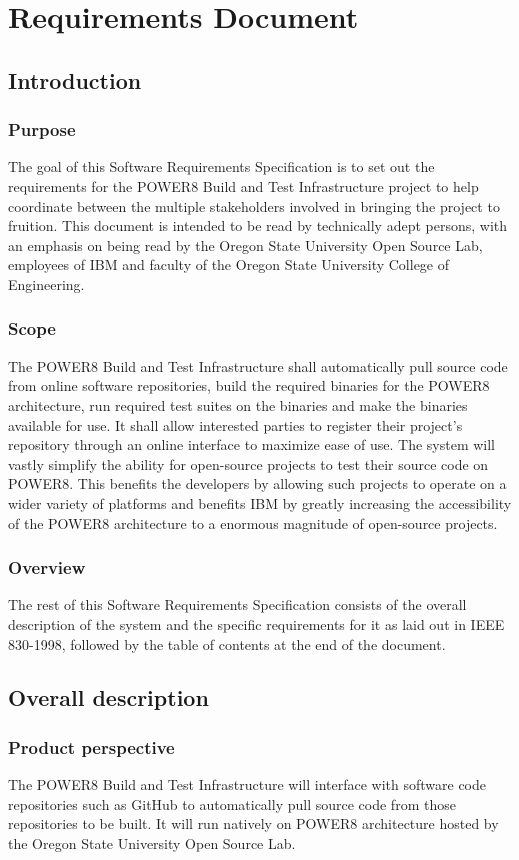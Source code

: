 \documentclass[10pt,letterpaper,onecolumn,draftclsnofoot]{IEEEtran}
\begin{document}
\section{Requirements Document}
\subsection{Introduction}
\subsubsection{Purpose}
The goal of this Software Requirements Specification is to set out the requirements for the POWER8 Build and Test Infrastructure project to help coordinate between the multiple stakeholders involved in bringing the project to fruition. This document is intended to be read by technically adept persons, with an emphasis on being read by the Oregon State University Open Source Lab, employees of IBM and faculty of the Oregon State University College of Engineering.
\subsubsection{Scope}
The POWER8 Build and Test Infrastructure shall automatically pull source code from online software repositories, build the required binaries for the POWER8 architecture, run required test suites on the binaries and make the binaries available for use. It shall allow interested parties to register their project's repository through an online interface to maximize ease of use. The system will vastly simplify the ability for open-source projects to test their source code on POWER8. This benefits the developers by allowing such projects to operate on a wider variety of platforms and benefits IBM by greatly increasing the accessibility of the POWER8 architecture to a enormous magnitude of open-source projects.
\subsubsection{Overview}
The rest of this Software Requirements Specification consists of the overall description of the system and the specific requirements for it as laid out in IEEE 830-1998, followed by the table of contents at the end of the document.

\subsection{Overall description}
\subsubsection{Product perspective}
The POWER8 Build and Test Infrastructure will interface with software code repositories such as GitHub to automatically pull source code from those repositories to be built. It will run natively on POWER8 architecture hosted by the Oregon State University Open Source Lab.
\end{document}
